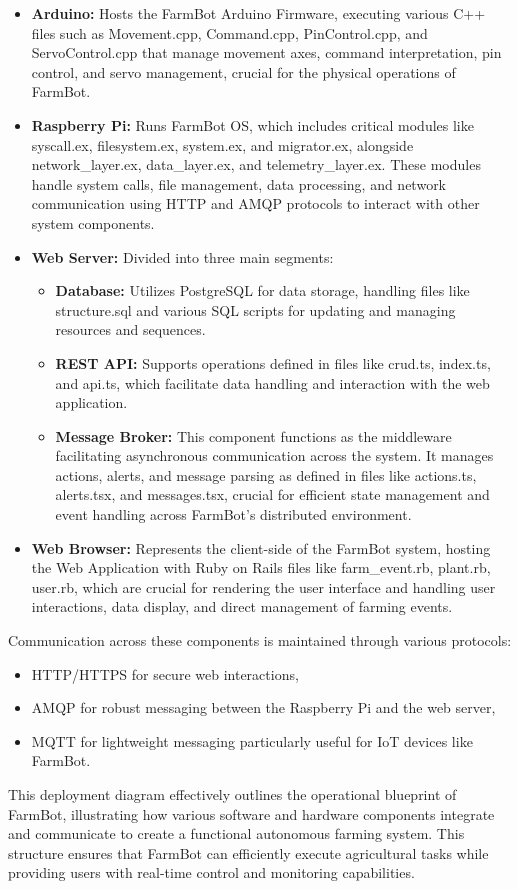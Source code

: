 \begin{itemize}
    \item \textbf{Arduino:} Hosts the FarmBot Arduino Firmware, executing various C++ files such as Movement.cpp, Command.cpp, PinControl.cpp, and ServoControl.cpp that manage movement axes, command interpretation, pin control, and servo management, crucial for the physical operations of FarmBot.
    \item \textbf{Raspberry Pi:} Runs FarmBot OS, which includes critical modules like syscall.ex, filesystem.ex, system.ex, and migrator.ex, alongside network\_layer.ex, data\_layer.ex, and telemetry\_layer.ex. These modules handle system calls, file management, data processing, and network communication using HTTP and AMQP protocols to interact with other system components.
    \item \textbf{Web Server:} Divided into three main segments:
        \begin{itemize}
            \item \textbf{Database:} Utilizes PostgreSQL for data storage, handling files like structure.sql and various SQL scripts for updating and managing resources and sequences.
            \item \textbf{REST API:} Supports operations defined in files like crud.ts, index.ts, and api.ts, which facilitate data handling and interaction with the web application.
            \item \textbf{Message Broker:} This component functions as the middleware facilitating asynchronous communication across the system. It manages actions, alerts, and message parsing as defined in files like actions.ts, alerts.tsx, and messages.tsx, crucial for efficient state management and event handling across FarmBot’s distributed environment.
        \end{itemize}
    \item \textbf{Web Browser:} Represents the client-side of the FarmBot system, hosting the Web Application with Ruby on Rails files like farm\_event.rb, plant.rb, user.rb, which are crucial for rendering the user interface and handling user interactions, data display, and direct management of farming events.
\end{itemize}
Communication across these components is maintained through various protocols:
\begin{itemize}
    \item HTTP/HTTPS for secure web interactions,
    \item AMQP for robust messaging between the Raspberry Pi and the web server,
    \item MQTT for lightweight messaging particularly useful for IoT devices like FarmBot.
\end{itemize}
This deployment diagram effectively outlines the operational blueprint of FarmBot, illustrating how various software and hardware components integrate and communicate to create a functional autonomous farming system. This structure ensures that FarmBot can efficiently execute agricultural tasks while providing users with real-time control and monitoring capabilities.

